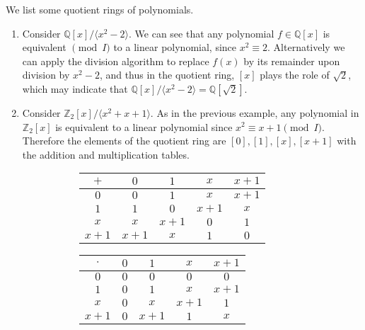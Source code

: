  \begin{example}
    We list some quotient rings of polynomials. 
    \begin{enumerate}
      \item Consider $\mathbb{Q}[x] / \langle x^2 - 2 \rangle$. We can see that any polynomial $f \in \mathbb{Q}[x]$ is equivalent $\pmod{I}$ to a linear polynomial, since $x^2 \equiv 2$. Alternatively we can apply the division algorithm to replace $f(x)$ by its remainder upon division by $x^2 - 2$, and thus in the quotient ring, $[x]$ plays the role of $\sqrt{2}$, which may indicate that $\mathbb{Q}[x] / \langle x^2 - 2 \rangle = \mathbb{Q}[\sqrt{2}]$. 
      \item Consider $\mathbb{Z}_2 [x]/ \langle x^2 + x + 1 \rangle$. As in the previous example, any polynomial in $\mathbb{Z}_2[x]$ is equivalent to a linear polynomial since $x^2 \equiv x + 1 \pmod{I}$. Therefore the elements of the quotient ring are $[0], [1], [x], [x+1]$ with the addition and multiplication tables. 

      \begin{figure}[H]
        \centering
        \begin{subfigure}[b]{0.48\textwidth}
          \centering
          \begin{tabular}{c|cccc}
            $+$ & $0$ & $1$ & $x$ & $x + 1$ \\
            \hline
            $0$ & $0$ & $1$ & $x$ & $x + 1$ \\
            $1$ & $1$ & $0$ & $x + 1$ & $x$ \\
            $x$ & $x$ & $x + 1$ & $0$ & $1$ \\
            $x + 1$ & $x + 1$ & $x$ & $1$ & $0$ \\
          \end{tabular}
          \caption{}
        \end{subfigure}
        \hfill 
        \begin{subfigure}[b]{0.48\textwidth}
          \centering
          \begin{tabular}{c|cccc}
            $\cdot$ & $0$ & $1$ & $x$ & $x + 1$ \\
            \hline
            $0$ & $0$ & $0$ & $0$ & $0$ \\
            $1$ & $0$ & $1$ & $x$ & $x + 1$ \\
            $x$ & $0$ & $x$ & $x + 1$ & $1$ \\
            $x + 1$ & $0$ & $x + 1$ & $1$ & $x$ \\
          \end{tabular}
          \caption{}
        \end{subfigure}
        \label{fig:boolean-algebra-tables}
      \end{figure}
    \end{enumerate}
  \end{example}

